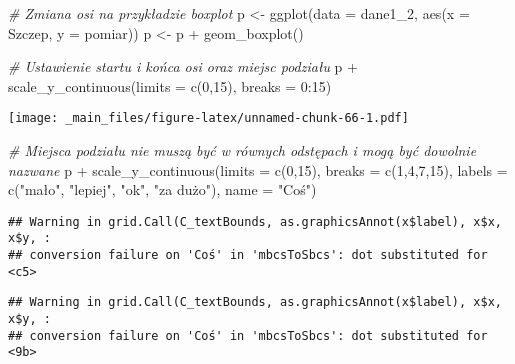 \documentclass[
]{book}
\newenvironment{Shaded}{\begin{snugshade}}{\end{snugshade}}
\newcommand{\AttributeTok}[1]{\textcolor[rgb]{0.77,0.63,0.00}{#1}}
\newcommand{\CommentTok}[1]{\textcolor[rgb]{0.56,0.35,0.01}{\textit{#1}}}
\newcommand{\DecValTok}[1]{\textcolor[rgb]{0.00,0.00,0.81}{#1}}
\newcommand{\FunctionTok}[1]{\textcolor[rgb]{0.00,0.00,0.00}{#1}}
\newcommand{\NormalTok}[1]{#1}
\newcommand{\OtherTok}[1]{\textcolor[rgb]{0.56,0.35,0.01}{#1}}
\newcommand{\SpecialCharTok}[1]{\textcolor[rgb]{0.00,0.00,0.00}{#1}}
\newcommand{\StringTok}[1]{\textcolor[rgb]{0.31,0.60,0.02}{#1}}
\begin{document}
\begin{Shaded}
\begin{Highlighting}[]
\CommentTok{\# Zmiana osi na przykładzie boxplot}
\NormalTok{p }\OtherTok{\textless{}{-}} \FunctionTok{ggplot}\NormalTok{(}\AttributeTok{data =}\NormalTok{ dane1\_2, }\FunctionTok{aes}\NormalTok{(}\AttributeTok{x =}\NormalTok{ Szczep, }\AttributeTok{y =}\NormalTok{ pomiar))}
\NormalTok{p }\OtherTok{\textless{}{-}}\NormalTok{ p }\SpecialCharTok{+} \FunctionTok{geom\_boxplot}\NormalTok{()}

\CommentTok{\# Ustawienie startu i końca osi oraz miejsc podziału}
\NormalTok{p }\SpecialCharTok{+} \FunctionTok{scale\_y\_continuous}\NormalTok{(}\AttributeTok{limits =} \FunctionTok{c}\NormalTok{(}\DecValTok{0}\NormalTok{,}\DecValTok{15}\NormalTok{), }\AttributeTok{breaks =} \DecValTok{0}\SpecialCharTok{:}\DecValTok{15}\NormalTok{)}
\end{Highlighting}
\end{Shaded}

\texttt{[image: \_main\_files/figure-latex/unnamed-chunk-66-1.pdf]}

\begin{Shaded}
\begin{Highlighting}[]
\CommentTok{\# Miejsca podziału nie muszą być w równych odstępach i mogą być dowolnie nazwane}
\NormalTok{p }\SpecialCharTok{+} \FunctionTok{scale\_y\_continuous}\NormalTok{(}\AttributeTok{limits =} \FunctionTok{c}\NormalTok{(}\DecValTok{0}\NormalTok{,}\DecValTok{15}\NormalTok{), }\AttributeTok{breaks =} \FunctionTok{c}\NormalTok{(}\DecValTok{1}\NormalTok{,}\DecValTok{4}\NormalTok{,}\DecValTok{7}\NormalTok{,}\DecValTok{15}\NormalTok{), }
                       \AttributeTok{labels =} \FunctionTok{c}\NormalTok{(}\StringTok{"mało"}\NormalTok{, }\StringTok{"lepiej"}\NormalTok{, }\StringTok{"ok"}\NormalTok{, }\StringTok{"za dużo"}\NormalTok{), }
                       \AttributeTok{name =} \StringTok{"Coś"}\NormalTok{)}
\end{Highlighting}
\end{Shaded}

\begin{verbatim}
## Warning in grid.Call(C_textBounds, as.graphicsAnnot(x$label), x$x, x$y, :
## conversion failure on 'Coś' in 'mbcsToSbcs': dot substituted for <c5>
\end{verbatim}

\begin{verbatim}
## Warning in grid.Call(C_textBounds, as.graphicsAnnot(x$label), x$x, x$y, :
## conversion failure on 'Coś' in 'mbcsToSbcs': dot substituted for <9b>
\end{verbatim}
\end{document}
